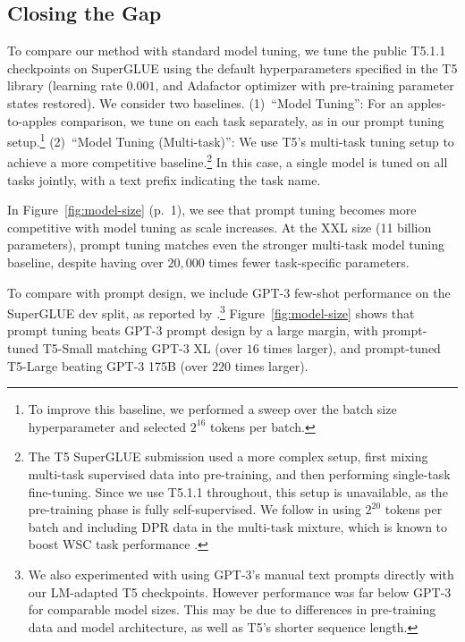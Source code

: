 \documentclass[11pt]{article}
\begin{document}
\subsection{Closing the Gap}

To compare our method with standard model tuning, we tune the public T5.1.1 checkpoints on SuperGLUE using the default hyperparameters specified in the T5 library (learning rate $0.001$, and Adafactor optimizer with pre-training parameter states restored). We consider two baselines. (1)~``Model Tuning'': For an apples-to-apples comparison, we tune on each task separately, as in our prompt tuning setup.\footnote{To improve this baseline, we performed a sweep over the batch size hyperparameter and selected $2^{16}$ tokens per batch.} (2)~``Model Tuning (Multi-task)'': We use T5's multi-task tuning setup to achieve a more competitive baseline.\footnote{The T5 SuperGLUE submission used a more complex setup, first mixing multi-task supervised data into pre-training, and then performing single-task fine-tuning. Since we use T5.1.1 throughout, this setup is unavailable, as the pre-training phase is fully self-supervised. We follow \citet{raffel_2020_t5} in using $2^{20}$ tokens per batch and including DPR data in the multi-task mixture, which is known to boost WSC task performance \cite{kocijan-etal-2019-surprisingly}.} In this case, a single model is tuned on all tasks jointly, with a text prefix indicating the task name.

In Figure~\ref{fig:model-size} (p.~1), we see that prompt tuning becomes more competitive with model tuning as scale increases. At the XXL size (11 billion parameters), prompt tuning matches even the stronger multi-task model tuning baseline, despite having over $20{,}000$ times fewer task-specific parameters.

To compare with prompt design, we include GPT-3 few-shot performance on the SuperGLUE dev split, as reported by \citet{brown_2020_gpt3}.\footnote{We also experimented with using GPT-3's manual text prompts directly with our LM-adapted T5 checkpoints. However performance was far below GPT-3 for comparable model sizes. This may be due to differences in pre-training data and model architecture, as well as T5's shorter sequence length.} Figure~\ref{fig:model-size} shows that prompt tuning beats \mbox{GPT-3} prompt design by a large margin, with prompt-tuned \mbox{T5-Small} matching \mbox{GPT-3} XL (over $16$ times larger), and prompt-tuned \mbox{T5-Large} beating \mbox{GPT-3} 175B (over $220$ times larger).
\end{document}
